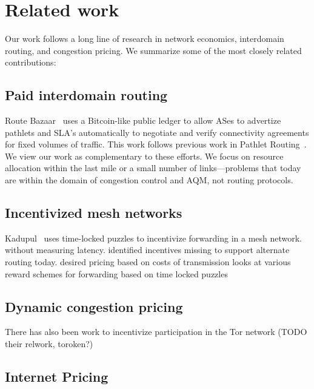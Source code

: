 \section{Related work}
\label{sec:related}

Our work follows a long line of research in network economics,
interdomain routing, and congestion pricing.  We summarize some of the
most closely related contributions:

\subsection{Paid interdomain routing}

Route Bazaar~\cite{routebazaar15} uses a Bitcoin-like public ledger to
allow ASes to advertize pathlets and SLA's automatically to negotiate
and verify connectivity agreements for fixed volumes of traffic. This
work follows previous work in Pathlet Routing~\cite{pathlet09}. We
view our work as complementary to these efforts. We focus on resource
allocation within the last mile or a small number of links---problems
that today are within the domain of congestion control and AQM, not
routing protocols.

\subsection{Incentivized mesh networks}

Kadupul~\cite{kadupul15} uses time-locked puzzles to incentivize
forwarding in a mesh network.
 without measuring latency.  identified incentives
missing to support alternate routing today. desired pricing based on
costs of transmission looks at various reward schemes for forwarding
based on time locked puzzles

\subsection{Dynamic congestion pricing}



There has also been work to incentivize participation in the Tor network\cite{torpath14, onions14} (TODO their relwork, toroken?)



\subsection{Internet Pricing}
